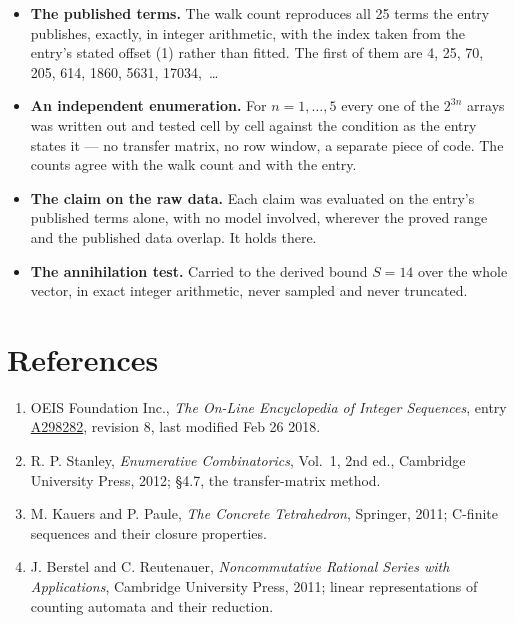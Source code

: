 \documentclass[11pt]{article}
\theoremstyle{definition}
\begin{document}
\begin{itemize}

\item {\bfseries The published terms.} The walk count reproduces all 25 terms the entry publishes, exactly, in integer arithmetic, with the index taken from the entry's stated offset (1) rather than fitted. The first of them are 4, 25, 70, 205, 614, 1860, 5631, 17034,~\dots

\item {\bfseries An independent enumeration.} For $n = 1,\dots,5$ every one of the $2^{3n}$ arrays was written out and tested cell by cell against the condition as the entry states it --- no transfer matrix, no row window, a separate piece of code. The counts agree with the walk count and with the entry.

\item {\bfseries The claim on the raw data.} Each claim was evaluated on the entry's published terms alone, with no model involved, wherever the proved range and the published data overlap. It holds there.

\item {\bfseries The annihilation test.} Carried to the derived bound $S = 14$ over the whole vector, in exact integer arithmetic, never sampled and never truncated.

\end{itemize}

\section{References}

\begin{enumerate}

\item OEIS Foundation Inc., \emph{The On-Line Encyclopedia of Integer Sequences}, entry \href{https://oeis.org/A298282}{A298282}, revision 8, last modified Feb 26 2018.

\item R. P. Stanley, \emph{Enumerative Combinatorics}, Vol.~1, 2nd ed., Cambridge University Press, 2012; \S4.7, the transfer-matrix method.

\item M. Kauers and P. Paule, \emph{The Concrete Tetrahedron}, Springer, 2011; C-finite sequences and their closure properties.

\item J. Berstel and C. Reutenauer, \emph{Noncommutative Rational Series with Applications}, Cambridge University Press, 2011; linear representations of counting automata and their reduction.

\end{enumerate}
\end{document}
